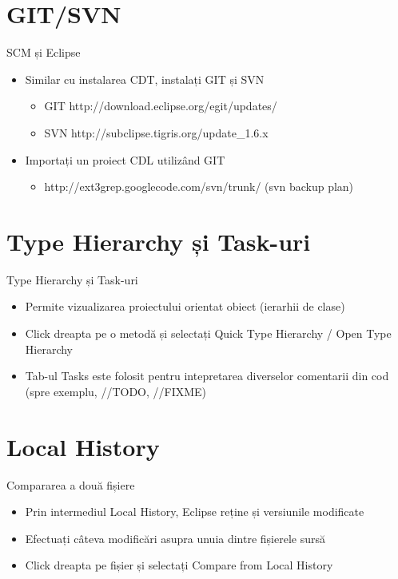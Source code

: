 \documentclass{beamer}
\begin{document}
\section{GIT/SVN}

\begin{frame}{SCM și Eclipse}
  \begin{itemize}
  \item Similar cu instalarea CDT, instalați GIT și SVN
  \pause
    \begin{itemize}
    \item GIT http://download.eclipse.org/egit/updates/
    \pause
    \item SVN http://subclipse.tigris.org/update\_1.6.x
    \pause
    \end{itemize}
  \item Importați un proiect CDL utilizând GIT
    \begin{itemize}
    \item http://ext3grep.googlecode.com/svn/trunk/ (svn backup plan)
    \end{itemize}
  \end{itemize}
\end{frame}

\section{Type Hierarchy și Task-uri}

\begin{frame}{Type Hierarchy și Task-uri }
  \begin{itemize}
  \item Permite vizualizarea proiectului orientat obiect (ierarhii de clase)
  \pause
  \item Click dreapta pe o metodă și selectați Quick Type Hierarchy / Open Type Hierarchy
  \pause
  \item Tab-ul Tasks este folosit pentru intepretarea diverselor comentarii din cod (spre exemplu, //TODO, //FIXME)
  \end{itemize}
\end{frame}

\section{Local History}

\begin{frame}{Compararea a două fișiere}
  \begin{itemize}
  \item Prin intermediul Local History, Eclipse reține și versiunile modificate 
  \pause
  \item Efectuați câteva modificări asupra unuia dintre fișierele sursă
  \pause
  \item Click dreapta pe fișier și selectați Compare from Local History
  \end{itemize}
\end{frame}
\end{document}
